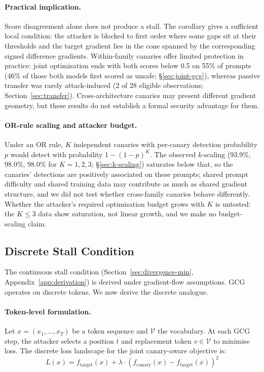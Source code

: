\documentclass{article}
\begin{document}
\paragraph{Practical implication.} Score disagreement alone does not produce a stall. The corollary gives a sufficient local condition: the attacker is blocked to first order where some gaps sit at their thresholds and the target gradient lies in the cone spanned by the corresponding signed difference gradients. Within-family canaries offer limited protection in practice: joint optimisation ends with both scores below 0.5 on 55\% of prompts (46\% of those both models first scored as unsafe; \S\ref{sec:joint-gcg}), whereas passive transfer was rarely attack-induced (2 of 28 eligible observations; Section~\ref{sec:transfer}). Cross-architecture canaries may present different gradient geometry, but these results do not establish a formal security advantage for them.

\paragraph{OR-rule scaling and attacker budget.} Under an OR rule, $K$ independent canaries with per-canary detection probability $p$ would detect with probability $1-(1-p)^K$. The observed $k$-scaling (93.9\%, 98.0\%, 98.0\% for $K=1,2,3$; \S\ref{sec:k-scaling}) saturates below that, so the canaries' detections are positively associated on these prompts; shared prompt difficulty and shared training data may contribute as much as shared gradient structure, and we did not test whether cross-family canaries behave differently. Whether the attacker's required optimisation budget grows with $K$ is untested: the $K \leq 3$ data show saturation, not linear growth, and we make no budget-scaling claim.

\subsection{Discrete Stall Condition}
\label{sec:discrete-stall}

The continuous stall condition (Section~\ref{sec:divergence-min}, Appendix~\ref{app:derivation}) is derived under gradient-flow assumptions. GCG operates on discrete tokens. We now derive the discrete analogue.

\paragraph{Token-level formulation.} Let $x = (x_1, \ldots, x_T)$ be a token sequence and $\mathcal{V}$ the vocabulary. At each GCG step, the attacker selects a position $t$ and replacement token $v \in \mathcal{V}$ to minimise loss. The discrete loss landscape for the joint canary-aware objective is:
\begin{equation}
L(x) = f_\text{target}(x) + \lambda \cdot (f_\text{canary}(x) - f_\text{target}(x))^2
\end{equation}
\end{document}
